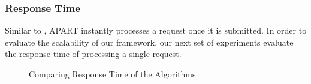 \subsubsection{Response Time}
\label{subsec:exprp}

Similar to \cite{Ma13,Huang14}, APART instantly processes a request once it is submitted. In order to evaluate the scalability of our framework, our next set of experiments evaluate the response time of processing a single request. 

\begin{figure}[h]
    \centering
    \vspace{-0.15in}
    \caption{Comparing Response Time of the Algorithms}
    \label{fig:rp}
\end{figure}

